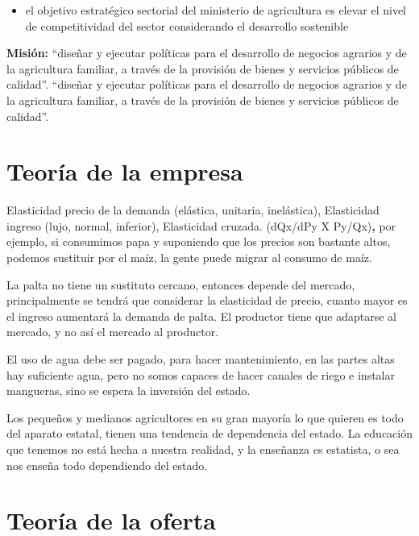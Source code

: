 \documentclass[
  a4paper,
]{article}
\providecommand{\tightlist}{%
  \setlength{\itemsep}{0pt}\setlength{\parskip}{0pt}}\usepackage{longtable,booktabs,array}
\begin{document}
\begin{itemize}
\tightlist
\item
  el objetivo estratégico sectorial del ministerio de agricultura es
  elevar el nivel de competitividad del sector considerando el
  desarrollo sostenible
\end{itemize}

\textbf{Misión:} ``diseñar y ejecutar políticas para el desarrollo de
negocios agrarios y de la agricultura familiar, a través de la provisión
de bienes y servicios públicos de calidad''. ``diseñar y ejecutar
políticas para el desarrollo de negocios agrarios y de la agricultura
familiar, a través de la provisión de bienes y servicios públicos de
calidad''.

\hypertarget{teoruxeda-de-la-empresa}{%
\section{Teoría de la empresa}\label{teoruxeda-de-la-empresa}}

Elasticidad precio de la demanda (elástica, unitaria, inelástica),
Elasticidad ingreso (lujo, normal, inferior), Elasticidad cruzada.
(dQx/dPy X Py/Qx)\textbf{,} por ejemplo, si consumimos papa y suponiendo
que los precios son bastante altos, podemos sustituir por el maíz, la
gente puede migrar al consumo de maíz.

La palta no tiene un sustituto cercano, entonces depende del mercado,
principalmente se tendrá que considerar la elasticidad de precio, cuanto
mayor es el ingreso aumentará la demanda de palta. El productor tiene
que adaptarse al mercado, y no así el mercado al productor.

El uso de agua debe ser pagado, para hacer mantenimiento, en las partes
altas hay suficiente agua, pero no somos capaces de hacer canales de
riego e instalar mangueras, sino se espera la inversión del estado.

Los pequeños y medianos agricultores en su gran mayoría lo que quieren
es todo del aparato estatal, tienen una tendencia de dependencia del
estado. La educación que tenemos no está hecha a nuestra realidad, y la
enseñanza es estatista, o sea nos enseña todo dependiendo del estado.

\hypertarget{teoruxeda-de-la-oferta}{%
\section{Teoría de la oferta}\label{teoruxeda-de-la-oferta}}
\end{document}
